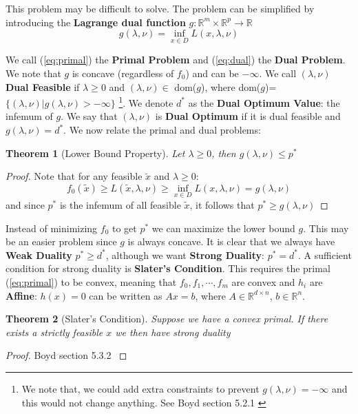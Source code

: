 \documentclass[]{article}
\theoremstyle{mattstyle}
\newtheorem{theorem}{Theorem}[section]
\theoremstyle{definition}
\begin{document}
This problem may be difficult to solve. The problem can be simplified by introducing the \textbf{Lagrange dual function} $g: \mathbb{R}^m\times \mathbb{R}^p \rightarrow \mathbb{R}$
\begin{equation}\label{eq:dual}
g(\lambda,\nu) =\inf\limits_{x\in D} L(x,\lambda,\nu)
\end{equation}

We call (\ref{eq:primal}) the \textbf{Primal Problem} and (\ref{eq:dual}) the \textbf{Dual Problem}. We note that $g$ is concave (regardless of $f_0$) and can be $-\infty$. We call $(\lambda, \nu)$ \textbf{Dual Feasible} if $\lambda \ge 0$ and $(\lambda, \nu) \in$ dom($g$), where dom($g$)=$\{ (\lambda, \nu) | g(\lambda, \nu)>-\infty\}$ \footnote{We note that, we could add extra constraints to prevent $g(\lambda, \nu)=-\infty$ and this would not change anything. See Boyd section 5.2.1 \cite{Boyd:2004:CO:993483}}. We denote $d^*$ as the \textbf{Dual Optimum Value}: the infemum of $g$. We say that $(\lambda,\nu)$ is \textbf{Dual Optimum} if it is dual feasible and $g(\lambda,\nu)=d^*$. We now relate the primal and dual problems:
\begin{theorem}[Lower Bound Property]
	Let $\lambda \ge 0$, then $g(\lambda, \nu) \le p^*$ 
\end{theorem}
\begin{proof}
	Note that for any feasible $\tilde{x}$ and $\lambda \ge 0$:
	$$f_0(\tilde{x}) \ge L(\tilde{x}, \lambda, \nu) \ge \inf\limits_{x\in D} L(x,\lambda,\nu) = g(\lambda, \nu)$$
	and since $p^*$ is the infemum of all feasible $\tilde{x}$, it follows that $ p^* \ge g(\lambda, \nu)$
\end{proof}

Instead of minimizing $f_0$ to get $p^*$ we can maximize the lower bound $g$. This may be an easier problem since $g$ is always concave. It is clear that we always have \textbf{Weak Duality} $p^* \ge d^*$, although we want \textbf{Strong Duality}: $p^* = d^*$. A sufficient condition for strong duality is \textbf{Slater's Condition}. This requires the primal (\ref{eq:primal}) to be convex, meaning that $f_0, f_1, \cdots, f_m$ are convex and $h_i$ are \textbf{Affine}: $h(x) = 0$ can be written as $Ax = b$, where $A \in \mathbb{R}^{d \times n}$, $b\in\mathbb{R}^n$.

\begin{theorem}[Slater's Condition]
	Suppose we have a convex primal. If there exists a strictly feasible $x$ we then have strong duality
\end{theorem}
\begin{proof}
	Boyd section 5.3.2 \cite{Boyd:2004:CO:993483}
\end{proof}
\end{document}

